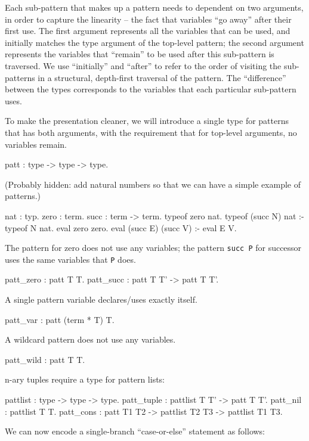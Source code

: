 \documentclass[format=acmlarge,review,anonymous]{acmart}\settopmatter{printfolios=true}
\begin{document}
Each sub-pattern that makes up a pattern needs to dependent on two arguments, in order to capture
the linearity -- the fact that variables ``go away'' after their first use. The first argument
represents all the variables that can be used, and initially matches the type argument of the
top-level pattern; the second argument represents the variables that ``remain'' to be used after
this sub-pattern is traversed. We use ``initially'' and ``after'' to refer to the order of visiting
the sub-patterns in a structural, depth-first traversal of the pattern. The ``difference'' between
the types corresponds to the variables that each particular sub-pattern uses.

To make the presentation cleaner, we will introduce a single type for
patterns that has both arguments, with the requirement that for
top-level arguments, no variables remain.

\begin{codequote}
patt : type -> type -> type.
\end{codequote}

\TODO (Probably hidden: add natural numbers so that we can have a simple example of patterns.)

\begin{codequote}
nat : typ.
zero : term.
succ : term -> term.
typeof zero nat.
typeof (succ N) nat :- typeof N nat.
eval zero zero.
eval (succ E) (succ V) :- eval E V.
\end{codequote}

The pattern for zero does not use any variables; the pattern \texttt{succ P} for successor uses the
same variables that \texttt{P} does.
\begin{codequote}
patt_zero : patt T T.
patt_succ : patt T T' -> patt T T'.
\end{codequote}
A single pattern variable declares/uses exactly itself.
\begin{codequote}
patt_var : patt (term * T) T.
\end{codequote}
A wildcard pattern does not use any variables.
\begin{codequote}
patt_wild : patt T T.
\end{codequote}
n-ary tuples require a type for pattern lists:
\begin{codequote}
pattlist : type -> type -> type.
patt_tuple : pattlist T T' -> patt T T'.
patt_nil : pattlist T T.
patt_cons : patt T1 T2 -> pattlist T2 T3 -> pattlist T1 T3.
\end{codequote}

We can now encode a single-branch ``case-or-else'' statement as follows:
\end{document}

